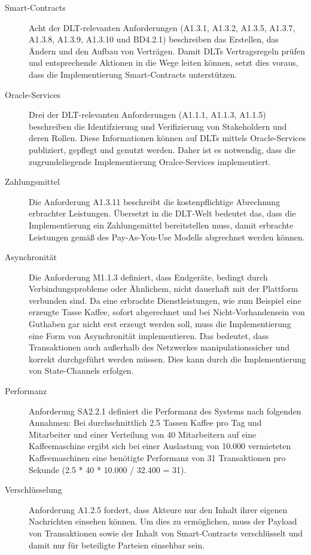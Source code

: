 \begin{description}
  \item[Smart-Contracts] Acht der \ac{DLT}-relevanten Anforderungen (A1.3.1, A1.3.2, A1.3.5, A1.3.7, A1.3.8, A1.3.9, A1.3.10 und BD4.2.1) beschreiben das Erstellen, das Ändern und den Aufbau von Verträgen. Damit \ac{DLT}s Vertragsregeln prüfen und entsprechende Aktionen in die Wege leiten können, setzt dies voraus, dass die Implementierung Smart-Contracts unterstützen.
  \item[Oracle-Services] Drei der \ac{DLT}-relevanten Anforderungen (A1.1.1, A1.1.3, A1.1.5) beschreiben die Identifzierung und Verifizierung von Stakeholdern und deren Rollen. Diese Informationen können auf \ac{DLT}s mittels Oracle-Services publiziert, gepflegt und genutzt werden. Daher ist es notwendig, dass die zugrundeliegende Implementierung Oralce-Services implementiert.
  \item[Zahlungsmittel] Die Anforderung A1.3.11 beschreibt die kostenpflichtige Abrechnung erbrachter Leistungen. Übersetzt in die \ac{DLT}-Welt bedeutet das, dass die Implementierung ein Zahlungsmittel bereitstellen muss, damit erbrachte Leistungen gemäß des Pay-As-You-Use Modells abgrechnet werden können.
  \item[Asynchronität] Die Anforderung M1.1.3 definiert, dass Endgeräte, bedingt durch Verbindungsprobleme oder Ähnlichem, nicht dauerhaft mit der Plattform verbunden sind. Da eine erbrachte Dienstleistungen, wie zum Beispiel eine erzeugte Tasse Kaffee, sofort abgerechnet und bei Nicht-Vorhandensein von Guthaben gar nicht erst erzeugt werden soll, muss die Implementierung eine Form von Asynchronität implementieren. Das bedeutet, dass Transaktionen auch außerhalb des Netzwerkes manipulationssicher und korrekt durchgeführt werden müssen. Dies kann durch die Implementierung von State-Channels erfolgen.
  \item[Performanz] Anforderung SA2.2.1 definiert die Performanz des Systems nach folgenden Annahmen: Bei durchschnittlich 2.5 Tassen Kaffee pro Tag und Mitarbeiter und einer Verteilung von 40 Mitarbeitern auf eine Kaffeemaschine ergibt sich bei einer Auslastung von 10.000 vermieteten Kaffeemaschinen eine benötigte Performanz von 31 Transaktionen pro Sekunde (2.5 * 40 * 10.000 / 32.400 = 31).
  \item[Verschlüsselung] Anforderung A1.2.5 fordert, dass Akteure nur den Inhalt ihrer eigenen Nachrichten einsehen können. Um dies zu ermöglichen, muss der Payload von Transaktionen sowie der Inhalt von Smart-Contracts verschlüsselt und damit nur für beteiligte Parteien einsehbar sein.
\end{description}
